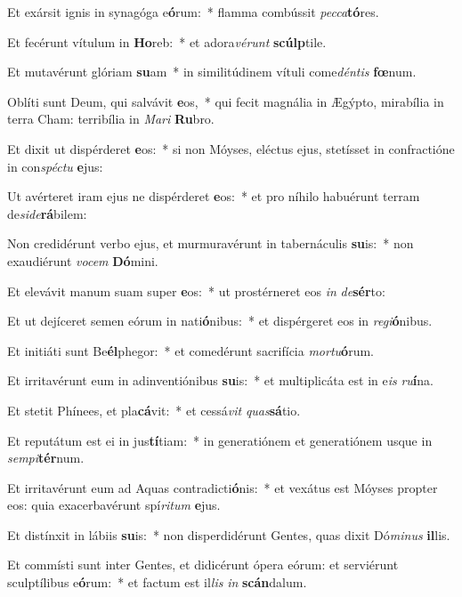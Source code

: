 \item Et exársit ignis in synagóga e\textbf{ó}rum:~* flamma combússit \textit{pec}\textit{ca}\textbf{tó}res.
\item Et fecérunt vítulum in \textbf{Ho}reb:~* et adora\textit{vé}\textit{runt} \textbf{scúlp}tile.
\item Et mutavérunt glóriam \textbf{su}am~* in similitúdinem vítuli come\textit{dén}\textit{tis} \textbf{fœ}num.
\item Oblíti sunt Deum, qui salvávit \textbf{e}os,~* qui fecit magnália in Ægýpto, mirabília in terra Cham: terribília in \textit{Ma}\textit{ri} \textbf{Ru}bro.
\item Et dixit ut dispérderet \textbf{e}os:~* si non Móyses, eléctus ejus, stetísset in confractióne in con\textit{spéc}\textit{tu} \textbf{e}jus:
\item Ut avérteret iram ejus ne dispérderet \textbf{e}os:~* et pro níhilo habuérunt terram de\textit{si}\textit{de}\textbf{rá}bilem:
\item Non credidérunt verbo ejus, et murmuravérunt in tabernáculis \textbf{su}is:~* non exaudiérunt \textit{vo}\textit{cem} \textbf{Dó}mini.
\item Et elevávit manum suam super \textbf{e}os:~* ut prostérneret eos \textit{in} \textit{de}\textbf{sér}to:
\item Et ut dejíceret semen eórum in nati\textbf{ó}nibus:~* et dispérgeret eos in \textit{re}\textit{gi}\textbf{ó}nibus.
\item Et initiáti sunt Be\textbf{él}phegor:~* et comedérunt sacrifícia \textit{mor}\textit{tu}\textbf{ó}rum.
\item Et irritavérunt eum in adinventiónibus \textbf{su}is:~* et multiplicáta est in e\textit{is} \textit{ru}\textbf{í}na.
\item Et stetit Phínees, et pla\textbf{cá}vit:~* et cessá\textit{vit} \textit{quas}\textbf{sá}tio.
\item Et reputátum est ei in jus\textbf{tí}tiam:~* in generatiónem et generatiónem usque in \textit{sem}\textit{pi}\textbf{tér}num.
\item Et irritavérunt eum ad Aquas contradicti\textbf{ó}nis:~* et vexátus est Móyses propter eos: quia exacerbavérunt spí\textit{ri}\textit{tum} \textbf{e}jus.
\item Et distínxit in lábiis \textbf{su}is:~* non disperdidérunt Gentes, quas dixit Dó\textit{mi}\textit{nus} \textbf{il}lis.
\item Et commísti sunt inter Gentes, et didicérunt ópera eórum: et serviérunt sculptílibus e\textbf{ó}rum:~* et factum est il\textit{lis} \textit{in} \textbf{scán}dalum.
